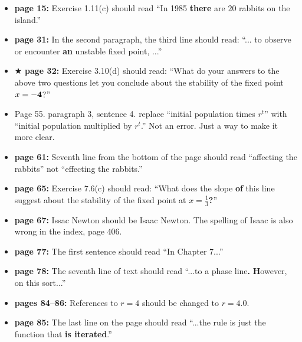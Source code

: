 \documentclass[12pt]{article}
\begin{document}
\begin{itemize}

  \item {\bf page 15:} Exercise 1.11(c) should read ``In 1985 {\bf
    there} are $20$ rabbits on the island.'' 

  \item {\bf page 31:}  In the second paragraph, the third line should
    read: ``... to observe or encounter {\bf an} unstable fixed point,
    ...''

  \item $\bigstar$ {\bf page 32:}  Exercise 3.10(d) should read:
    ``What do your answers to the above two questions let you conclude
    about the stability of the fixed point $x= {\bf -4}$?''


  \item Page 55.  paragraph 3, sentence 4.  replace ``initial
    population times $r^t$'' with ``initial population multiplied by
    $r^t$.''  Not an error.  Just a way to make it more clear. 

  \item {\bf page 61:} Seventh line from the bottom of the page should
    read ``affecting the rabbits'' not ``effecting the rabbits.''

  \item {\bf page 65:} Exercise 7.6(c) should read: ``What does the
    slope {\bf of} this line suggest about the stability of the fixed
    point at $x=\frac{1}{3}${\bf ?}''

  \item {\bf page 67:}  Issac Newton should be Isaac Newton.  The
    spelling of Isaac is also wrong in the index, page 406.

  \item {\bf page 77:}  The first sentence should read ``In Chapter
    7...'' 

  \item {\bf page 78:}  The seventh line of text should read ``...to a
    phase line{\bf .} {\bf H}owever, on this sort...''

  \item {\bf pages 84--86:} References to $r=4$ should be changed to
    $r=4.0$. 

  \item {\bf page 85:}  The last line on the page should read ``...the
    rule is just the function that {\bf is iterated}.''


\end{itemize}
\end{document}
